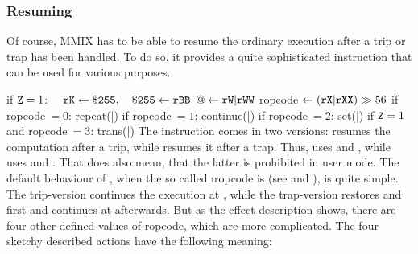 \subsubsection{Resuming}

Of course, MMIX has to be able to resume the ordinary execution after a trip or trap has been handled. To do so, it provides a quite sophisticated instruction that can be used for various purposes.

\instrtbleight
	{}
	{if ${\tt Z} = 1$:}
	{$\quad {\tt rK} \leftarrow {\tt \$255},\quad {\tt \$255} \leftarrow {\tt rBB}$}
	{$@ \leftarrow {\tt rW}|{\tt rWW}$}
	{ropcode$~\leftarrow ({\tt rX}|{\tt rXX}) \gg 56$}
	{if ropcode$~= 0$: repeat(|)}
	{if ropcode$~= 1$: continue(|)}
	{if ropcode$~= 2$: set(|)}
	{if ${\tt Z} = 1~$and ropcode$~= 3$: trans(|)}
\noindent The instruction  comes in two versions:  resumes the computation after a trip, while  resumes it after a trap. Thus,  uses  and , while  uses  and . That does also mean, that the latter is prohibited in user mode. The default behaviour of , when the so called \i{ropcode} is  (see  and ), is quite simple. The trip-version continues the execution at , while the trap-version restores  and  first and continues at  afterwards. But as the effect description shows, there are four other defined values of ropcode, which are more complicated. The four sketchy described actions have the following meaning:
